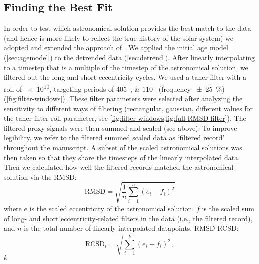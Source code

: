 \documentclass[]{agujournal2019}
\newcommand{\rez}{\textcolor{magenta}}
\newcommand{\ijk}{\textcolor{blue}}
\begin{document}

\subsection{Finding the Best Fit}\label{sec:algorithm}

In order to test which astronomical solution provides the best match to the data
(and hence is more likely to reflect the true history of the solar system)
we adopted and extended the approach of .
We applied the initial age model (\cref{sec:agemodel}) to the detrended data (\cref{sec:detrend}).
After linearly interpolating to a timestep that is a multiple of the timestep of the astronomical solution,
we filtered out the long and short eccentricity cycles.
We used a taner filter with a roll of \num{e10}, targeting periods of \qtylist{405;110}{\kiloyear} (frequency \qty{\pm25}{\percent}) (\cref{fig:filter-windows}).
These filter parameters were selected after analyzing the sensitivity to different ways of filtering (rectangular, gaussian, different values for the taner filter roll parameter, see \cref{fig:filter-windows,fig:full-RMSD-filter}).
The filtered proxy signals were then summed and scaled (see above).
To improve legibility, we refer to the filtered summed scaled data as `filtered record' throughout the manuscript.
A subset of the scaled astronomical solutions was then taken so that they share the timesteps of the linearly interpolated data.
Then we calculated how well the filtered records matched the astronomical solution via the \gls{RMSD}:
\begin{equation}\label{eqn:rmsd}
    \text{RMSD} = \sqrt{\frac{1}{n}\sum_{i=1}^{n}(e_{i} - f_{i})^{2}}
\end{equation}
where \(e\) is the scaled eccentricity of the astronomical solution, \(f\) is the scaled sum of long- and short eccentricity-related filters in the data (i.e., the filtered record), and \(n\) is the total number of linearly interpolated datapoints.
 \gls{RMSD}  \gls{RCSD}:
\begin{equation}
\text{RCSD}_{i} = \sqrt{\sum_{i=1}^{k}(e_{i} - f_{i})^{2}},
\end{equation}
 \(k\) 
\end{document}
